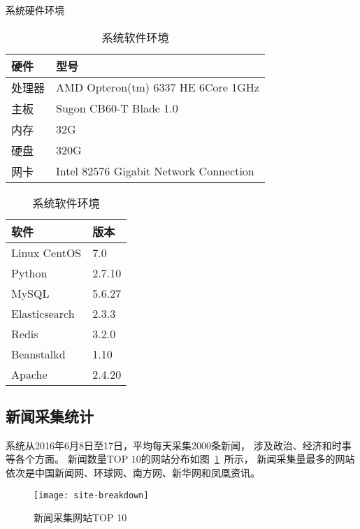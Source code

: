 \begin{table}[htbp]
\centering
\begin{minipage}{0.45\textwidth}
\caption{系统硬件环境}
\label{tbl:hard-env}
\vspace{0.5em}\centering\wuhao
\begin{tabular}{ll}
\toprule[1.5pt]
硬件 & 型号 \\
\midrule[1pt]
处理器 & AMD Opteron(tm) 6337 HE 6Core 1GHz \\
主板 & Sugon CB60-T Blade 1.0 \\
内存 & 32G \\
硬盘 & 320G \\
网卡 & Intel 82576 Gigabit Network Connection \\
\bottomrule[1.5pt]
\end{tabular}
\end{minipage}
\hfill
\begin{minipage}{0.45\textwidth}
\caption{系统软件环境}
\label{tbl:soft-env}
\vspace{0.5em}\centering\wuhao
\begin{tabular}{ll}
\toprule[1.5pt]
软件 & 版本 \\
\midrule[1pt]
Linux CentOS & 7.0 \\
Python & 2.7.10 \\
MySQL & 5.6.27 \\
Elasticsearch & 2.3.3 \\
Redis & 3.2.0 \\
Beanstalkd & 1.10 \\
Apache & 2.4.20 \\
\bottomrule[1.5pt]
\end{tabular}
\end{minipage}
\end{table}

\subsection{新闻采集统计}

系统从2016年6月8日至17日，平均每天采集2000条新闻，
涉及政治、经济和时事等各个方面。
新闻数量TOP 10的网站分布如图~\ref{fig:site-breakdown}~所示，
新闻采集量最多的网站依次是中国新闻网、环球网、南方网、新华网和凤凰资讯。

\begin{figure}[htbp]
\centering
\texttt{[image: site-breakdown]}
\caption{新闻采集网站TOP 10}
\label{fig:site-breakdown}
\end{figure}


